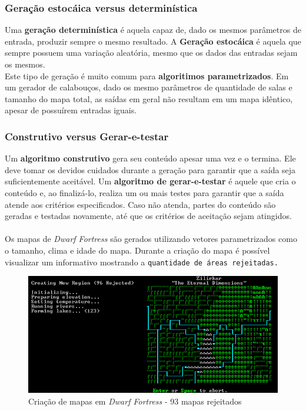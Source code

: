	\subsubsection*{Geração estocáica versus determinística}
		Uma \textbf{geração determinística} é aquela capaz de, dado os mesmos parâmetros de entrada, produzir sempre
		o mesmo resultado. A \textbf{Geração estocáica} é aquela que sempre possuem uma variação aleatória, mesmo que os dados das entradas sejam os mesmos.
		\\Este tipo de geração é muito comum para \textbf{algoritimos parametrizados}. Em um gerador de 		
		calabouços, dado os mesmo parâmetros de quantidade de salas e tamanho do mapa total, as saídas em geral não resultam em um mapa idêntico, apesar de possuírem entradas iguais. 
	\subsubsection*{Construtivo versus Gerar-e-testar}
		Um \textbf{algoritmo construtivo} gera seu conteúdo apesar uma vez e o termina. Ele deve tomar os devidos 
		cuidados durante a geração para garantir que a saída seja suficientemente aceitável. Um \textbf{algoritmo de gerar-e-testar} é aquele que cria o conteúdo e, ao finalizá-lo, realiza um ou mais 	
		testes para garantir que a saída atende aos critérios especificados. Caso não atenda, partes do conteúdo são geradas e testadas novamente, até que os critérios de aceitação sejam atingidos.
		\\ \\ Os mapas de \textit{Dwarf Fortress} são gerados utilizando vetores parametrizados como o tamanho, clima e idade do mapa. Durante a criação do mapa é possível visualizar um informativo mostrando a \texttt{quantidade de áreas 
		rejeitadas.}	
\begin{figure}[h]
	\centering
	\label{fig06}
		\includegraphics[keepaspectratio=true,scale=0.5]{figuras/fig06-dwarf.png}
	\caption{Criação de mapas em \textit{Dwarf Fortress} - 93 mapas rejeitados}
\end{figure}
	
